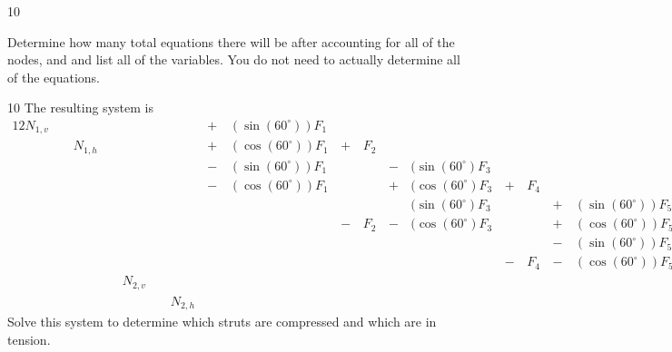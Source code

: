 \begin{applicationActivities}
\begin{activity}{10}
\begin{subactivity}
Determine how many total equations there will be after accounting for all of the nodes, and and list all of the variables.  You do not need to actually determine all of the equations.
\end{subactivity}
\end{activity}


\begin{activity}{10}
\drawtruss[0.8]
The resulting system is
\begin{alignat*}{12}
N_{1,v} &\,\,& &\,\,& &\,\,& &\,+\,& (\sin(60^\circ))F_1 &\,\,& &\,\,& &\,\,& &\,\,& &\,\,& &\,\,& &\,=\,& 0 \\
        &\,\,& N_{1,h} &\,\,& &\,\,& &\,+\,& (\cos(60^\circ))F_1 &\,+\,&F_2 &\,\,& &\,\,& &\,\,& &\,\,& &\,\,& &\,=\,& 0 \\
        &\,\,&         &\,\,& &\,\,& &\,-\,& (\sin(60^\circ))F_1 &\,\,& &\,-\,&(\sin(60^\circ)F_3 &\,\,& &\,\,& &\,\,& &\,\,& &\,=\,& 0 \\
        &\,\,&         &\,\,& &\,\,& &\,-\,& (\cos(60^\circ))F_1 &\,\,& &\,+\,&(\cos(60^\circ)F_3 &\,+\,&F_4 &\,\,& &\,\,& &\,\,& &\,=\,& 0 \\
        &\,\,&         &\,\,& &\,\,& &\,\,&                     &\,\,& &\,\,&(\sin(60^\circ)F_3 &\,\,& &\,+\,& (\sin(60^\circ))F_5&\,\,& &\,\,& &\,=\,& 10000 \\
        &\,\,&         &\,\,& &\,\,& &\,\,&                     &\,-\,& F_2&\,-\,&(\cos(60^\circ)F_3 &\,\,& &\,+\,& (\cos(60^\circ))F_5&\,+\,&F_6 &\,\,& &\,=\,& 0 \\
        &\,\,&         &\,\,& &\,\,& &\,\,&                     &\,\,& &\,\,&                   &\,\,& &\,-\,& (\sin(60^\circ))F_5&\,\,& &\,-\,& (\sin(60^\circ))F_7&\,=\,& 0 \\
        &\,\,&         &\,\,& &\,\,& &\,\,&                     &\,\,& &\,\,&                   &\,-\,&F_4 &\,-\,& (\cos(60^\circ))F_5&\,\,& &\,+\,& (\cos(60^\circ))F_7&\,=\,& 0 \\
        &\,\,&         &\,\,& N_{2,v} &\,\,& &\,\,&                     &\,\,& &\,\,&                   &\,\,& &\,\,&                    &\,\,& &\,+\,& (\sin(60^\circ))F_7&\,=\,& 0 \\
        &\,\,&         &\,\,& &\,\,&N_{2,h} &\,\,&                     &\,\,& &\,\,&                   &\,\,&    &\,\,&                    &\,-\,& F_6 &\,-\,& (\cos(60^\circ))F_7&\,=\,& 0
\end{alignat*}
Solve this system to determine which struts are compressed and which are in tension.
\end{activity}


\end{applicationActivities}
